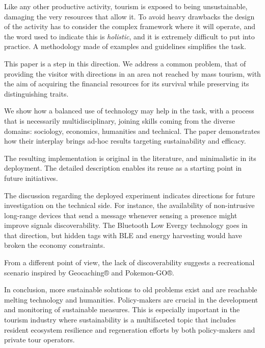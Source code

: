 \documentclass[sustainability,article,submit,pdftex,moreauthors]{Definitions/mdpi}
\begin{document}
Like any other productive activity, tourism is exposed to being unsustainable, damaging the very resources that allow it. To avoid heavy drawbacks the design of the activity has to consider the complex framework where it will operate, and the word used to indicate this is \emph{holistic}, and it is extremely difficult to put into practice. A methodology made of examples and guidelines simplifies the task.

This paper is a step in this direction. We address a common problem, that of providing the visitor with directions in an area not reached by mass tourism, with the aim of acquiring the financial resources for its survival while preserving its distinguishing traits.

We show how a balanced use of technology may help in the task, with a process that is necessarily multidisciplinary, joining skills coming from the diverse domains: sociology, economics, humanities and technical. The paper demonstrates how their interplay brings ad-hoc results targeting sustainability and efficacy.

The resulting implementation is original in the literature, and minimalistic in its deployment. The detailed description enables its reuse as a starting point in future initiatives.

The discussion regarding the deployed experiment indicates directions for future investigation on the technical side. For instance, the availability of non-intrusive long-range devices that send a message whenever sensing a presence might improve signals discoverability. The Bluetooth Low Evergy technology goes in that direction, but hidden tags with BLE and energy harvesting would have broken the economy constraints.

From a different point of view, the lack of discoverability suggests a recreational scenario inspired by Geocaching® and Pokemon-GO®.

In conclusion, more sustainable solutions to old problems exist and are reachable melting technology and humanities. Policy-makers are crucial in the development and monitoring of sustainable measures. This is especially important in the tourism industry where sustainability is a multifaceted topic that includes resident ecosystem resilience and regeneration efforts by both policy-makers and private tour operators.

\end{document}
